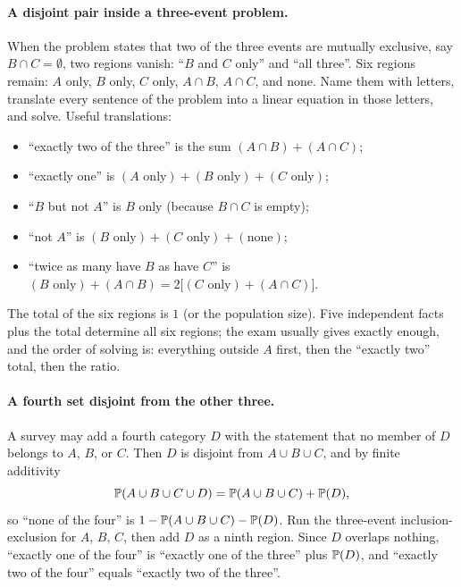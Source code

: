 \paragraph{A disjoint pair inside a three-event problem.}
When the problem states that two of the three events are mutually exclusive, say
$B \cap C = \emptyset$, two regions vanish: ``$B$ and $C$ only'' and ``all three''.
Six regions remain: $A$ only, $B$ only, $C$ only, $A \cap B$, $A \cap C$, and none.
Name them with letters, translate every sentence of the problem into a linear
equation in those letters, and solve. Useful translations:
\begin{itemize}[nosep]
  \item ``exactly two of the three'' is the sum $(A\cap B) + (A \cap C)$;
  \item ``exactly one'' is $(A \text{ only}) + (B \text{ only}) + (C \text{ only})$;
  \item ``$B$ but not $A$'' is $B$ only (because $B \cap C$ is empty);
  \item ``not $A$'' is $(B \text{ only}) + (C \text{ only}) + (\text{none})$;
  \item ``twice as many have $B$ as have $C$'' is $(B\text{ only}) + (A \cap B) = 2\bigl[(C \text{ only}) + (A \cap C)\bigr]$.
\end{itemize}
The total of the six regions is $1$ (or the population size). Five independent
facts plus the total determine all six regions; the exam usually gives exactly
enough, and the order of solving is: everything outside $A$ first, then the
``exactly two'' total, then the ratio.

\paragraph{A fourth set disjoint from the other three.}
A survey may add a fourth category $D$ with the statement that no member of $D$
belongs to $A$, $B$, or $C$. Then $D$ is disjoint from $A \cup B \cup C$, and
by finite additivity
\[
  \mathbb{P}(A \cup B \cup C \cup D) = \mathbb{P}(A \cup B \cup C) + \mathbb{P}(D),
\]
so ``none of the four'' is $1 - \mathbb{P}(A\cup B\cup C) - \mathbb{P}(D)$. Run the
three-event inclusion-exclusion for $A$, $B$, $C$, then add $D$ as a ninth region.
Since $D$ overlaps nothing, ``exactly one of the four'' is ``exactly one of the
three'' plus $\mathbb{P}(D)$, and ``exactly two of the four'' equals ``exactly two of the
three''.

